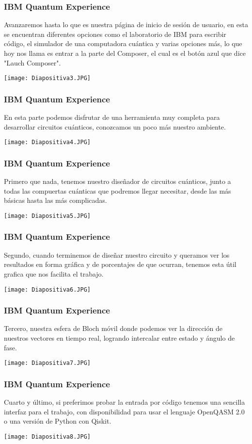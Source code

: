 \documentclass[spanish]{beamer}
\begin{document}
 \newpage\justify \begin{frame}
 \frametitle{IBM Quantum Experience} 
 Avanzaremos hasta lo que es nuestra página de inicio de sesión de usuario, en esta se encuentran diferentes opciones como el laboratorio de IBM para escribir código, el simulador de una computadora cuántica y varias opciones más, lo que hoy nos llama es entrar a la parte del Composer, el cual es el botón azul que dice "Lauch Composer".
 
 \centering\texttt{[image: Diapositiva3.JPG]}
 \end{frame}
 
  \newpage\justify \begin{frame}
 \frametitle{IBM Quantum Experience} 
En esta parte podemos disfrutar de una herramienta muy completa para desarrollar circuitos cuánticos, conozcamos un poco más nuestro ambiente. 
 
 \centering\texttt{[image: Diapositiva4.JPG]}
 \end{frame}
 
  \newpage\justify \begin{frame}
 \frametitle{IBM Quantum Experience} 
 Primero que nada, tenemos nuestro diseñador de circuitos cuánticos, junto a todas las compuertas cuánticas que podremos llegar necesitar, desde las más básicas hasta las más complicadas.
 
 \centering\texttt{[image: Diapositiva5.JPG]}
 \end{frame}
 
  \newpage\justify \begin{frame}
 \frametitle{IBM Quantum Experience} 
 Segundo, cuando terminemos de diseñar nuestro circuito y queramos ver los resultados en forma gráfica y de porcentajes de que ocurran, tenemos esta útil grafica que nos facilita el trabajo.
 
 \centering\texttt{[image: Diapositiva6.JPG]}
 \end{frame}
 
  \newpage\justify \begin{frame}
 \frametitle{IBM Quantum Experience} 
 Tercero, nuestra esfera de Bloch móvil donde podemos ver la dirección de nuestros vectores en tiempo real, logrando intercalar entre estado y ángulo de fase.
 
 \centering\texttt{[image: Diapositiva7.JPG]}
 \end{frame}
 
 \newpage\justify \begin{frame}
 \frametitle{IBM Quantum Experience} 
Cuarto y último, si preferimos probar la entrada por código tenemos una sencilla interfaz para el trabajo, con disponibilidad para usar el lenguaje OpenQASM 2.0 o una versión de Python con Qiskit.
 
 \centering\texttt{[image: Diapositiva8.JPG]}
 \end{frame}
 
\end{document}
